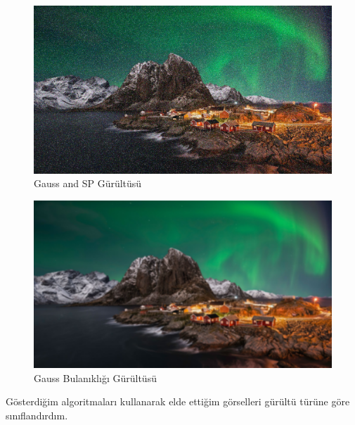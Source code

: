 \documentclass{article}
\begin{document}
\begin{figure}
     \centering
  \includegraphics[angle=360,width=1.1\textwidth]{GaussAndSPN.png}\centering 
  \caption{Gauss and SP Gürültüsü}
  \label{fig:resim_etiketi}
\end{figure}

\begin{figure}
     \centering
  \includegraphics[angle=360,width=1.1\textwidth]{GaussBulanıklıgı.png}\centering 
  \caption{Gauss Bulanıklığı Gürültüsü}
  \label{fig:resim_etiketi}
\end{figure}

\newpage
\noindent Gösterdiğim algoritmaları kullanarak elde ettiğim görselleri gürültü türüne göre sınıflandırdım.\vspace{0,5cm}
\end{document}
